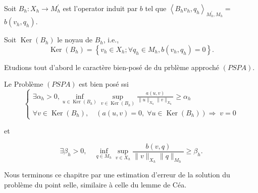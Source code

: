 Soit  $B_{h}: X_{h} \rightarrow M_{h}^{\prime}$ est l'operator induit  par  $b$ tel que  $\left\langle B_{h} v_{h}, q_{h}\right\rangle_{M_{h}^{\prime}, M_{h}}=$ $b\left(v_{h}, q_{h}\right) .$

 Soit  $\operatorname{Ker}\left(B_{h}\right)$ le noyau de  $B_{h}$, i.e.,
$$
\operatorname{Ker}\left(B_{h}\right)=\left\{v_{h} \in X_{h} ; \forall q_{h} \in M_{h}, b\left(v_{h}, q_{h}\right)=0\right\}. 
$$

Etudions tout d'abord le caractère bien-posé de du prblème  approché $(PSPA)$.


\begin{proposition}
	Le Problème $(PSPA)$ est bien posé ssi 
	\begin{equation}\label{psp}
		\left\{\begin{array}{l}
			\exists \alpha_h>0, \displaystyle \inf _{u \in \operatorname{Ker}(B_h)} \sup _{v \in \operatorname{Ker}(B_h)} \frac{a(u, v)}{\|u\|_{X_h}\|v\|_{X_h}} \geq \alpha_h \\
			\forall v \in \operatorname{Ker}(B_h), \quad( a(u, v)=0, \; \forall u \in \operatorname{Ker}(B_h)) \Rightarrow \; v=0
		\end{array}\right.
	\end{equation}
	
	et 
	
	\begin{equation}\label{psp1}
		\exists \beta_h>0, \quad \inf _{q \in M_h} \sup _{v \in X_h} \frac{b(v, q)}{\|v\|_{X_h}\|q\|_{M_h}} \geq \beta_h.
	\end{equation}
	
\end{proposition}


Nous terminons ce chapitre par une estimation d'erreur de la solution du problème du point selle, similaire à celle du lemme de Céa.
  




